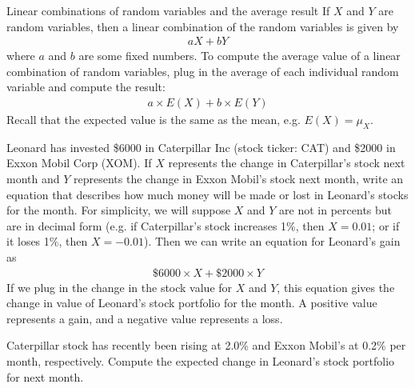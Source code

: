 \begin{onebox}{Linear combinations of random variables and the average result}
If $X$ and $Y$ are random variables, then a linear combination of the random variables is given by
\begin{align*}
aX + bY
\end{align*}
where $a$ and $b$ are some fixed numbers. To compute the average value of a linear combination of random variables, plug in the average of each individual random variable and compute the result:
\begin{align*}
a\times E(X) + b\times E(Y)
\end{align*}
Recall that the expected value is the same as the mean, e.g. $E(X) = \mu_X$.
\end{onebox}

\begin{examplewrap}
\begin{nexample}{Leonard has invested \$6000 in Caterpillar Inc
    (stock ticker: CAT) and \$2000 in Exxon Mobil Corp (XOM).
    If $X$ represents the change in Caterpillar's stock next month
    and $Y$ represents the change in Exxon Mobil's stock
    next month, write an equation that describes how much
    money will be made or lost in Leonard's stocks for the
    month.}
  For simplicity, we will suppose $X$ and $Y$ are not
  in percents but are in decimal form
  (e.g. if Caterpillar's stock increases 1\%, then $X=0.01$;
  or if it loses 1\%, then $X=-0.01$).
  Then we can write an equation for Leonard's gain as
  \begin{align*}
  \$6000\times X + \$2000\times Y
  \end{align*}
  If we plug in the change in the stock value for $X$ and $Y$,
  this equation gives the change in value of Leonard's stock
  portfolio for the month. A positive value represents a gain,
  and a negative value represents a loss.
\end{nexample}
\end{examplewrap}

\begin{exercisewrap}
\begin{nexercise}\label{expectedChangeInLeonardsStockPortfolio}
Caterpillar stock has recently been rising
at 2.0\% and Exxon Mobil's at 0.2\% per month, respectively.
Compute the expected change in Leonard's stock portfolio
for next month.\footnotemark
\end{nexercise}
\end{exercisewrap}

